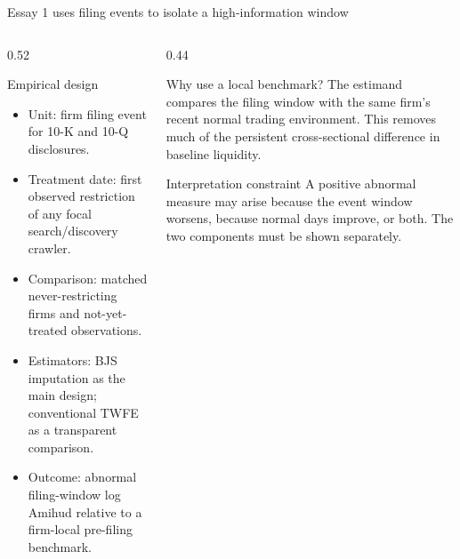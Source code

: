 \documentclass[aspectratio=169,10pt]{beamer}
\newcommand{\tightitems}{\setlength\itemsep{0.11cm}\setlength\parskip{0pt}}
\begin{document}
\begin{frame}[t]{Essay 1 uses filing events to isolate a high-information window}
\begin{columns}[T,onlytextwidth]
  \begin{column}{0.52\textwidth}
    \begin{block}{Empirical design}
    \small
    \begin{itemize}\tightitems
      \item Unit: firm filing event for 10-K and 10-Q disclosures.
      \item Treatment date: first observed restriction of any focal search/discovery crawler.
      \item Comparison: matched never-restricting firms and not-yet-treated observations.
      \item Estimators: BJS imputation as the main design; conventional TWFE as a transparent comparison.
      \item Outcome: abnormal filing-window log Amihud relative to a firm-local pre-filing benchmark.
    \end{itemize}
    \end{block}
  \end{column}
  \begin{column}{0.44\textwidth}
    \begin{block}{Why use a local benchmark?}
    \small
    The estimand compares the filing window with the same firm's recent normal trading environment. This removes much of the persistent cross-sectional difference in baseline liquidity.
    \end{block}
    \begin{alertblock}{Interpretation constraint}
    \small
    A positive abnormal measure may arise because the event window worsens, because normal days improve, or both. The two components must be shown separately.
    \end{alertblock}
  \end{column}
\end{columns}
\end{frame}
\end{document}

